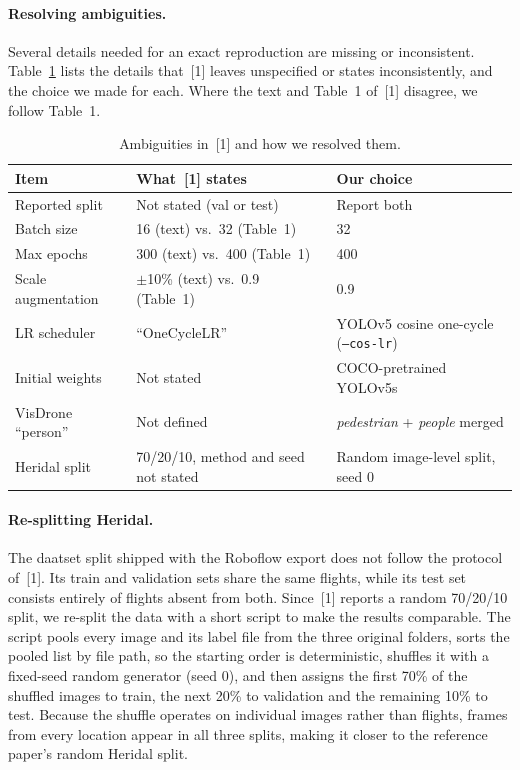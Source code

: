 \documentclass{article}
\begin{document}
\paragraph{Resolving ambiguities.} Several details needed for an exact reproduction are missing or inconsistent. Table~\ref{tab:ambig} lists the details that~[1] leaves unspecified or states inconsistently, and the choice we made for each. Where the text and Table~1 of~[1] disagree, we follow Table~1.
 
\begin{table}[h]
  \caption{Ambiguities in~[1] and how we resolved them.}
  \label{tab:ambig}
  \centering
  \small
  \begin{tabular}{p{3.2cm}p{4.6cm}p{4.6cm}}
    \toprule
    Item & What~[1] states & Our choice \\
    \midrule
    Reported split & Not stated (val or test) & Report both \\
    Batch size & 16 (text) vs.\ 32 (Table~1) & 32 \\
    Max epochs & 300 (text) vs.\ 400 (Table~1) & 400 \\
    Scale augmentation & $\pm$10\% (text) vs.\ 0.9 (Table~1) & 0.9 \\
    LR scheduler & ``OneCycleLR'' & YOLOv5 cosine one-cycle (\texttt{--cos-lr}) \\
    Initial weights & Not stated & COCO-pretrained YOLOv5s \\
    VisDrone ``person'' & Not defined & \emph{pedestrian} + \emph{people} merged \\
    Heridal split & 70/20/10, method and seed not stated & Random image-level split, seed 0 \\
    \bottomrule
  \end{tabular}
\end{table}
 
\paragraph{Re-splitting Heridal.} The daatset split shipped with the Roboflow export does not follow the protocol of~[1]. Its train and validation sets share the same flights, while its test set consists entirely of flights absent from both. Since~[1] reports a random 70/20/10 split, we re-split the data with a short script to make the results comparable. The script pools every image and its label file from the three original folders, sorts the pooled list by file path, so the starting order is deterministic, shuffles it with a fixed-seed random generator (seed 0), and then assigns the first 70\% of the shuffled images to train, the next 20\% to validation and the remaining 10\% to test. Because the shuffle operates on individual images rather than flights, frames from every location appear in all three splits, making it closer to the reference paper's random Heridal split.
 
\end{document}
